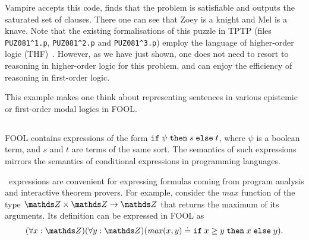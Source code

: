 Vampire accepts this code, finds that the problem is satisfiable and outputs the saturated set of clauses. There one can see that Zoey is a knight and Mel is a knave. Note that the existing formalisations of this puzzle in TPTP (files \verb'PUZ081^1.p', \verb'PUZ081^2.p' and \verb'PUZ081^3.p') employ the language of higher-order logic (THF)~\cite{THF}. However, as we have just shown, one does not need to resort to reasoning in higher-order logic for this problem, and can enjoy the efficiency of reasoning in first-order logic.

%
%
%
%
%
%
%
%

This example makes one think about representing sentences in various epistemic or first-order modal logics in FOOL.

\subsection{\ITE}

FOOL contains expressions of the form $\mathtt{if}\;{\psi}\;\allowbreak\mathtt{then}\;{s}\;\allowbreak\mathtt{else}\;{t}$, where $\psi$ is a boolean term, and $s$ and $t$ are terms of the same sort. The semantics of such expressions mirrors the semantics of conditional expressions in programming languages.

\ITE\ expressions are convenient for expressing formulas coming from program analysis and interactive theorem provers. For example, consider the $\mathit{max}$ function of the type $\Z \times \Z \to \Z$ that returns the maximum of its arguments. Its definition can be expressed in FOOL as
\begin{equation}\label{eq:ite-t-example}
  (\forall x:\Z)(\forall y:\Z)(\mathit{max}(x, y) \eql \ite{x \geq y}{x}{y}).
\end{equation}

